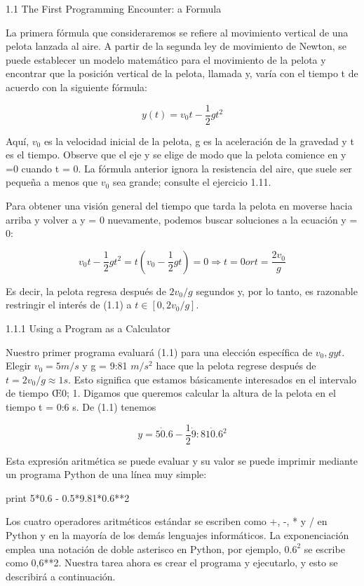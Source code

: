 \begin{frame}

1.1 The First Programming Encounter: a Formula 

La primera fórmula que consideraremos se refiere al movimiento vertical de una pelota lanzada al aire. A partir de la segunda ley de movimiento de Newton, se puede establecer un modelo matemático para el movimiento de la pelota y encontrar que la posición vertical de la pelota, llamada y, varía con el tiempo t de acuerdo con la siguiente fórmula:

$$
y(t) =  v_0 t - \frac{1}{2} g t^2 
$$

Aquí, $v_0$ es la velocidad inicial de la pelota, g es la aceleración de la gravedad y t es el tiempo. Observe que el eje y se elige de modo que la pelota comience en y =0 cuando t = 0. La fórmula anterior ignora la resistencia del aire, que suele ser pequeña a menos que $v_0$ sea grande; consulte el ejercicio 1.11.

Para obtener una visión general del tiempo que tarda la pelota en moverse hacia arriba y volver a y = 0 nuevamente, podemos buscar soluciones a la ecuación y = 0:

$$
v_0t - \frac{1}{2} g t^2 =  t(v_0 - \frac{1}{2} gt) = 0 \Rightarrow t = 0 or t = \frac{2v_0}{g}
$$ 

Es decir, la pelota regresa después de $2v_0/g$ segundos y, por lo tanto, es razonable restringir el interés de (1.1) a $t \in [0,  2v_0/g]$.

\end{frame}

\begin{frame}
1.1.1 Using a Program as a Calculator 

Nuestro primer programa evaluará (1.1) para una elección específica de $v_0, g y t$. Elegir $v_0 =5 m/s$ y g = 9:81 $m/s^2$ hace que la pelota regrese después de $t = 2v_0/g \approx 1 s$. Esto significa que estamos básicamente interesados en el intervalo de tiempo Œ0; 1. Digamos que queremos calcular la altura de la pelota en el tiempo t = 0:6 s. De (1.1) tenemos


$$
y = 5 \dot  0.6 - \frac{1}{2} \dot 9:81 \dot  0.6^2 
$$ 

Esta expresión aritmética se puede evaluar y su valor se puede imprimir mediante un programa Python de una línea muy simple:

print 5*0.6 - 0.5*9.81*0.6**2 

Los cuatro operadores aritméticos estándar se escriben como +, -, * y / en Python y en la mayoría de los demás lenguajes informáticos. La exponenciación emplea una notación de doble asterisco en Python, por ejemplo, $0.6^2$ se escribe como 0,6**2. Nuestra tarea ahora es crear el programa y ejecutarlo, y esto se describirá a continuación.

\end{frame}


